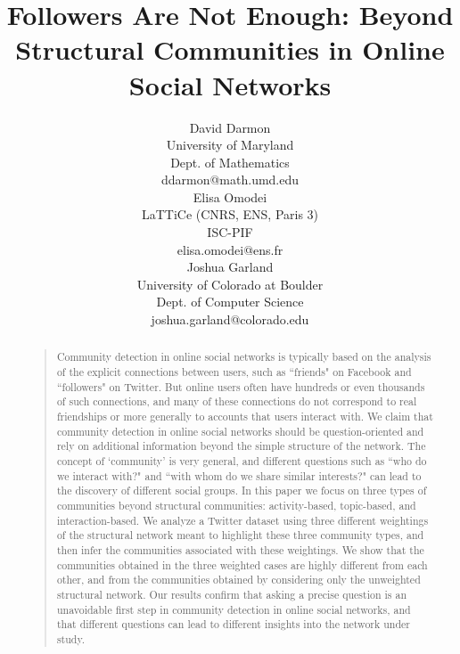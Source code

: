 \documentclass[letterpaper]{article}
\begin{document}
\title{
Followers Are Not Enough: Beyond Structural Communities in Online Social Networks%
 }
 
 \author{David Darmon  \\
 University of Maryland\\
 Dept. of Mathematics \\
 ddarmon@math.umd.edu \\
 \And Elisa Omodei \\
 LaTTiCe (CNRS, ENS, Paris 3)\\
 ISC-PIF\\
 elisa.omodei@ens.fr \\
 \And 
 Joshua Garland\\
 University of Colorado at Boulder\\
 Dept. of Computer Science \\
 joshua.garland@colorado.edu}

\maketitle

\begin{abstract}
\begin{quote}
Community detection in online social networks is typically based on the analysis of the explicit connections between users, such as ``friends" on Facebook and ``followers" on Twitter. But online users often have hundreds or even thousands of such connections, and many of these connections do not correspond to real friendships or more generally to accounts that users interact with. We claim that community detection in online social networks should be question-oriented and rely on additional information beyond the simple structure of the network. The concept of `community' is very general, and different questions such as ``who do we interact with?" and ``with whom do we share similar interests?" can lead to the discovery of different social groups. In this paper we focus on three types of communities beyond structural communities: activity-based, topic-based, and interaction-based. We analyze a Twitter dataset using three different weightings of the structural network meant to highlight these three community types, and then infer the communities associated with these weightings. We show that the communities obtained in the three weighted cases are highly different from each other, and from the communities obtained by considering only the unweighted structural network. Our results confirm that asking a precise question is an unavoidable first step in community detection in online social networks, and that different questions can lead to different insights into the network under study.
\end{quote}
\end{abstract}








\end{document}
